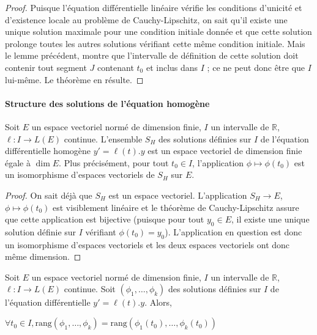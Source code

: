 \begin{proof}
Puisque l'équation différentielle linéaire vérifie les
conditions d'unicité et d'existence locale au problème de
Cauchy-Lipschitz, on sait qu'il existe une unique solution maximale pour
une condition initiale donnée et que cette solution prolonge toutes les
autres solutions vérifiant cette même condition initiale. Mais le lemme
précédent, montre que l'intervalle de définition de cette solution doit
contenir tout segment $J$ contenant $t_0$ et inclus dans $I$ ; ce ne
peut donc être que $I$ lui-même. Le théorème en résulte.
\end{proof}

\paragraph{Structure des solutions de l'équation homogène}

\begin{thm}
Soit $E$ un espace vectoriel normé de dimension finie, $I$
un intervalle de $\mathbb{R}$, $\ell : I \rightarrow L(E)$ continue. L'ensemble $S_H$ des
solutions définies sur $I$ de l'équation différentielle homogène $y' =
\ell(t).y$ est un espace vectoriel de dimension finie égale à
$\dim E$. Plus précisément, pour tout
$t_0 \in I$, l'application
$\phi \mapsto \phi(t_0)$ est un isomorphisme
d'espaces vectoriels de $S_H$ sur $E$.
\end{thm}

\begin{proof}
On sait déjà que $S_H$ est un espace vectoriel.
L'application $S_H \rightarrow E$,
$\phi \mapsto \phi(t_0)$ est visiblement linéaire et
le théorème de Cauchy-Lipschitz assure que cette application est
bijective (puisque pour tout $y_0 \in E$, il existe une unique
solution définie sur $I$ vérifiant $\phi(t_0) = y_0$).
L'application en question est donc un isomorphisme d'espaces vectoriels
et les deux espaces vectoriels ont donc même dimension.
\end{proof}

\begin{cor}
Soit $E$ un espace vectoriel normé de dimension finie, $I$
un intervalle de $\mathbb{R}$, $\ell : I \rightarrow L(E)$ continue. Soit
$(\phi_1,\ldots,\phi_k)$
des solutions définies sur $I$ de l'équation différentielle $y' = \ell(t).y$.
Alors,

$\forall t_0 \in I,
\text{rang}(\phi_1,\ldots,\phi_k) = \text{rang}(\phi_1(t_0),\ldots,\phi_k(t_0))$
\end{cor}

